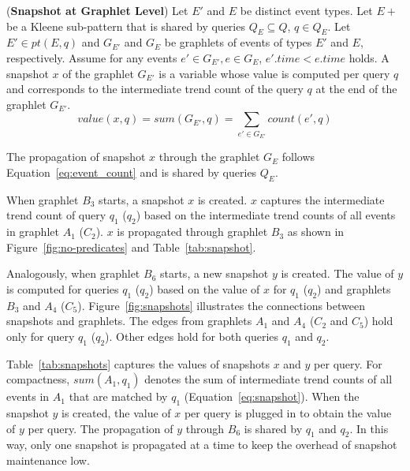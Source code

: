 \begin{definition}(\textbf{Snapshot at Graphlet Level})
%
Let $E'$ and $E$ be distinct event types.
Let $E+$ be a Kleene sub-pattern that is shared by queries $Q_E \subseteq Q$, $q \in Q_E$.
Let $E' \in \mathit{pt}(E,q)$ and $G_{E'}$ and $G_E$ be graphlets of events of types $E'$ and $E$, respectively.
Assume for any events $e' \in G_{E'}, e \in G_E$, $e'.time < e.time$ holds. 
A snapshot $x$ of the graphlet $G_{E'}$ is a variable whose value is computed per query $q$ and corresponds to the intermediate trend count of the query $q$ at the end of the graphlet $G_{E'}$. 
%
\begin{equation}
\mathit{value}(x,q) = \mathit{sum}(G_{E'},q) = \sum_{e' \in G_{E'}} \mathit{count}(e',q)
\label{eq:snapshot}
\end{equation}

The propagation of snapshot $x$ through the graphlet $G_E$ follows Equation~\ref{eq:event_count} and is shared by queries $Q_E$.
%
\label{def:snapshot}
\end{definition}



\begin{example}
When graphlet $B_3$ starts, a snapshot $x$ is created. $x$ captures the intermediate trend count of query $q_1$ ($q_2$) based on the intermediate trend counts of all events in graphlet $A_1$ ($C_2$). $x$ is propagated through graphlet $B_3$ as shown in Figure~\ref{fig:no-predicates} and Table~\ref{tab:snapshot}. 

Analogously, when graphlet $B_6$ starts, a new snapshot $y$ is created. The value of $y$ is computed for queries $q_1$ ($q_2$) based on the value of $x$ for $q_1$ ($q_2$) and graphlets $B_3$ and $A_4$ ($C_5$). Figure~\ref{fig:snapshots} illustrates the connections between snapshots and graphlets. The edges from graphlets $A_1$ and $A_4$ ($C_2$ and $C_5$) hold only for query $q_1$ ($q_2$). Other edges hold for both queries $q_1$ and $q_2$.

Table~\ref{tab:snapshots} captures the values of snapshots $x$ and $y$ per query. For compactness, $sum(A_1,q_1)$ denotes the sum of intermediate trend counts of all events in $A_1$ that are matched by $q_1$ (Equation~\ref{eq:snapshot}). 
When the snapshot $y$ is created, the value of $x$ per query is plugged in to obtain the value of $y$ per query. The propagation of $y$ through $B_6$ is shared by $q_1$ and $q_2$. In this way, only one snapshot is propagated at a time to keep the overhead of snapshot maintenance low.
\end{example}

